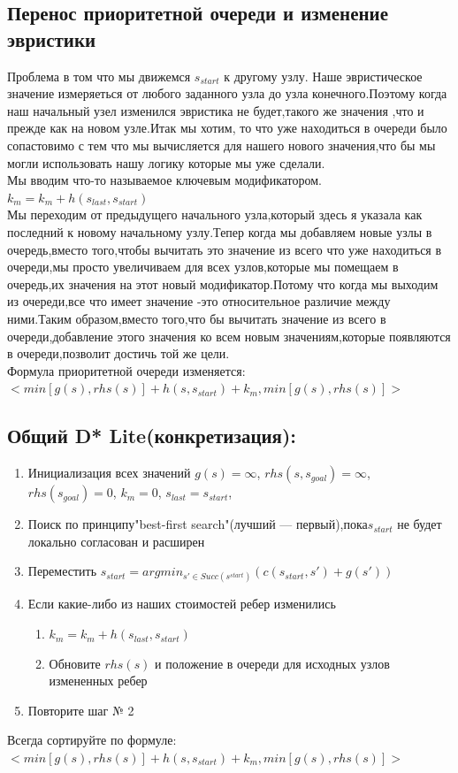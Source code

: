 \documentclass[12pt]{article}
\begin{document}
\subsection*{Перенос приоритетной очереди и изменение эвристики}
Проблема в том что мы движемся $s_{start}$ к другому узлу. Наше эвристическое значение измеряеться от любого заданного узла до узла конечного.Поэтому когда наш начальный узел изменился эвристика не будет,такого же значения ,что и прежде как на новом узле.Итак мы хотим, то что уже находиться в очереди было сопастовимо с тем что мы вычисляется для нашего нового значения,что бы мы могли использовать нашу логику которые мы уже сделали.\\
Мы вводим что-то называемое ключевым модификатором.\\$k_m=k_m+h(s_{last},s_{start})$\\ Мы переходим от предыдущего начального узла,который здесь я указала как последний к новому начальному узлу.Тепер когда мы добавляем новые узлы в очередь,вместо того,чтобы вычитать это значение из всего что уже находиться в очереди,мы просто увеличиваем для всех узлов,которые мы помещаем в очередь,их значения на этот новый модификатор.Потому что когда мы выходим из очереди,все что имеет значение -это относительное различие между ними.Таким образом,вместо того,что бы вычитать значение из всего в очереди,добавление этого значения ко всем новым значениям,которые появляются в очереди,позволит достичь той же цели.\\
Формула приоритетной очереди изменяется:\\
$<min[g(s),rhs(s)]+h(s,s_{start})+k_m,min[g(s),rhs(s)]>$
\subsection*{Общий D* Lite(конкретизация):}
\begin{enumerate}
    \item Инициализация всех значений $g(s)=\infty$, $rhs(s,s_{goal})=\infty$, $rhs(s_{goal})=0$, $k_m=0$, $s_{last}=s_{start}$,
    \item Поиск по принципу"best-first search"(лучший — первый),пока$s_{start}$ не будет локально согласован и расширен
    \item Переместить $s_{start}=argmin_{s'\in Succ(s^{start})}(c(s_{start},s')+g(s'))$
     \item Если какие-либо из наших стоимостей ребер изменились
     \begin{enumerate} 
        \item $k_m=k_m+h(s_{last},s_{start})$
        \item Обновите $rhs(s)$ и положение в очереди для исходных узлов измененных ребер
    \end{enumerate}
    \item Повторите шаг № 2
\end{enumerate}
\begin{center}
   Всегда сортируйте по формуле:\\$<min[g(s),rhs(s)]+h(s,s_{start})+k_m,min[g(s),rhs(s)]>$\\
\end{center}
\end{document}
